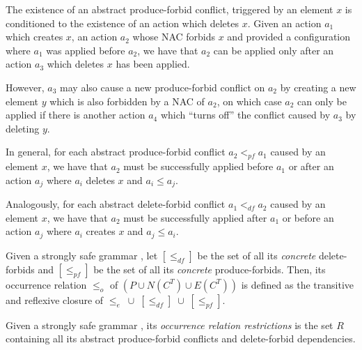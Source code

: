 \begin{remark} The existence of an abstract produce-forbid conflict, triggered by an element $x$ is conditioned to the existence of an action which deletes $x$. Given an action $a_1$ which creates $x$, an action $a_2$ whose NAC forbids $x$ and provided a configuration where $a_1$ was applied before $a_2$, we have that $a_2$ can be applied only after an action $a_3$ which deletes $x$ has been applied.

  However, $a_3$ may also cause a new produce-forbid conflict on $a_2$ by creating a new element $y$ which is also forbidden by a NAC of $a_2$, on which case $a_2$ can only be applied if there is another action $a_4$ which ``turns off'' the conflict caused by $a_3$ by deleting $y$.

  In general, for each abstract produce-forbid conflict $a_2 <_{pf} a_1$ caused by an element $x$, we have that $a_2$ must be successfully applied before $a_1$ or after an action $a_{j}$ where $a_i$ deletes $x$ and $a_i \leq a_j$.

  Analogously, for each abstract delete-forbid conflict $a_1 <_{df} a_2$ caused by an element $x$, we have that $a_2$ must be successfully applied after $a_1$ or before an action $a_j$ where $a_i$ creates $x$ and $a_j \leq a_i$.
\end{remark}

\begin{definition} Given a strongly safe grammar \doublyTypedGraphGrammarCore{}, let $[\leq_{df}]$ be the set of all its \emph{concrete} delete-forbids and $[\leq_{pf}]$ be the set of all its \emph{concrete} produce-forbids. Then, its occurrence relation $\leq_o$ of $(P \cup N(C^T) \cup E(C^T))$ is defined as the transitive and reflexive closure of \mbox{$\leq_{e}$ $\cup$ $[\leq_{df}]$ $\cup$ $[\leq_{pf}]$}.
\end{definition}

\begin{definition} Given a strongly safe grammar \doublyTypedGraphGrammarCore{}, its \emph{occurrence relation restrictions} is the set $R$ containing all its abstract produce-forbid conflicts and delete-forbid dependencies.
\end{definition}

